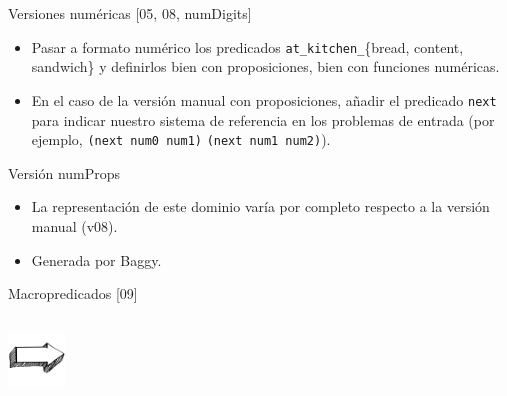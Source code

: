 \documentclass{beamer}
\begin{document}

\begin{frame}{Versiones numéricas [05, 08, numDigits]}
    \begin{itemize}
        \item Pasar a formato numérico los predicados \texttt{at\_kitchen\_}\{bread, content, sandwich\} y definirlos bien con proposiciones, bien con funciones numéricas.
        \item En el caso de la versión manual con proposiciones, añadir el predicado \texttt{next} para indicar nuestro sistema de referencia en los problemas de entrada (por ejemplo, \texttt{(next num0 num1)} \texttt{(next num1 num2)}).
    \end{itemize}
    \parbox{2in}{\shadowbox{
        }}
\end{frame}


\begin{frame}{Versión numProps}
    \begin{itemize}
        \item La representación de este dominio varía por completo respecto a la versión manual (v08).
        \item Generada por Baggy.
    \end{itemize}
\end{frame}


\begin{frame}{Macropredicados [09]}
    \begin{columns}
    
    \parbox{2in}{\shadowbox{
    
    }}
    \parbox{2in}{\shadowbox{
    
    }}
    \parbox{2in}{\shadowbox{
    
    }}
    \parbox{2in}{\shadowbox{
    
    }}
    
    \begin{flushright}
    \includegraphics[width=1.5cm,height=1.5cm]{arrow}
    \end{flushright}
    
    \parbox{2in}{\shadowbox{
    
    }}
    \parbox{2in}{\shadowbox{
    
    }}
    \end{columns}
\end{frame}
\end{document}
